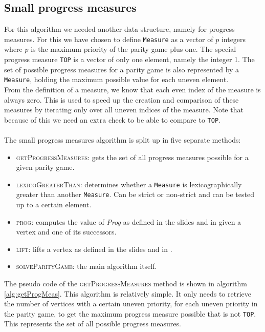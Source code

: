 \documentclass[10pt,a4paper]{article}
\newcommand{\algoname}[1]{\textnormal{\textsc{#1}}}
\begin{document}
\subsection{Small progress measures}
For this algorithm we needed another data structure, namely for progress measures. For this we have chosen to define \texttt{Measure} as a vector of $p$ integers where $p$ is the maximum priority of the parity game plus one. The special progress measure \texttt{TOP} is a vector of only one element, namely the integer 1. The set of possible progress measures for a parity game is also represented by a \texttt{Measure}, holding the maximum possible value for each uneven element.\\
From the definition of a measure, we know that each even index of the measure is always zero. This is used to speed up the creation and comparison of these measures by iterating only over all uneven indices of the measure. Note that because of this we need an extra check to be able to compare to \texttt{TOP}.
\\\\
The small progress measures algorithm is split up in five separate methods:
\begin{itemize}
\item \algoname{getProgressMeasures}: gets the set of all progress measures possible for a given parity game.
\item \algoname{lexicoGreaterThan}: determines whether a \texttt{Measure} is lexicographically greater than another \texttt{Measure}. Can be strict or non-strict and can be tested up to a certain element.
\item \algoname{prog}: computes the value of \textit{Prog} as defined in the slides and in \cite{spmpaper} given a vertex and one of its successors.
\item \algoname{lift}: lifts a vertex as defined in the slides and in \cite{spmpaper}.
\item \algoname{solveParityGame}: the main algorithm itself.\\
\end{itemize}

The pseudo code of the \algoname{getProgressMeasures} method is shown in algorithm \ref{alg:getProgMeas}. This algorithm is relatively simple. It only needs to retrieve the number of vertices with a certain uneven priority, for each uneven priority in the parity game, to get the maximum progress measure possible that is not \texttt{TOP}. This represents the set of all possible progress measures.
\end{document}
